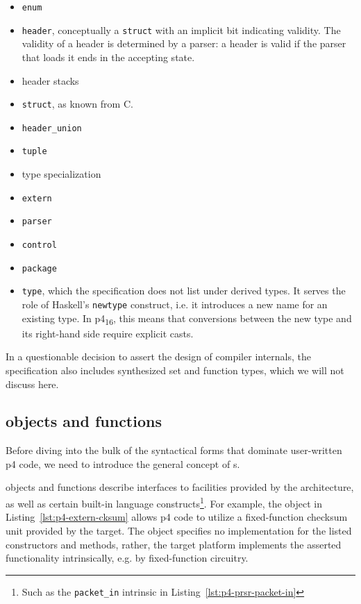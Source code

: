 \begin{itemize}
	\item \texttt{enum}
	\item \texttt{header}, conceptually a \texttt{struct} with an implicit bit
	indicating validity. The validity of a header is determined by a parser: a
	header is valid if the parser that loads it ends in the accepting state.
	\item header stacks
	\item \texttt{struct}, as known from C.
	\item \texttt{header\_union}
	\item \texttt{tuple}
	\item type specialization
	\item \texttt{extern}
	\item \texttt{parser}
	\item \texttt{control}
	\item \texttt{package}
	\item \texttt{type}, which the specification does not list under derived
	types. It serves the role of Haskell's \texttt{newtype} construct, i.e. it
	introduces a new name for an existing type. In
	\acrshort{p4}\textsubscript{16}, this means that conversions between the new
	type and its right-hand side require explicit casts.
\end{itemize}

In a questionable decision to assert the design of compiler internals, the
specification also includes synthesized set and function types, which we will
not discuss here.

\subsection*{\extern{} objects and functions}

Before diving into the bulk of the syntactical forms that dominate user-written
\acrshort{p4} code, we need to introduce the general concept of \extern{}s.

\extern{} objects and functions describe interfaces to facilities provided by
the architecture, as well as certain built-in language constructs\footnote{Such
as the \texttt{packet\_in} intrinsic in Listing~\ref{lst:p4-prsr-packet-in}}.
For example, the \extern{} object in Listing~\ref{lst:p4-extern-cksum} allows
\acrshort{p4} code to utilize a fixed-function checksum unit provided by the
target. The object specifies no implementation for the listed constructors and
methods, rather, the target platform implements the asserted functionality
intrinsically, e.g. by fixed-function circuitry.

